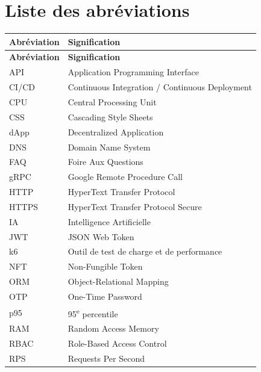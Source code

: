 \chapter*{Liste des abréviations}

\vspace{0.5cm}

\renewcommand{\arraystretch}{1.4}

\begin{longtable}{|p{3cm}|p{11cm}|}
\hline
\textbf{Abréviation} & \textbf{Signification} \\
\hline
\endfirsthead
\hline
\textbf{Abréviation} & \textbf{Signification} \\
\hline
\endhead
\hline
\endfoot
API       & Application Programming Interface \\ \hline
CI/CD     & Continuous Integration / Continuous Deployment \\ \hline
CPU       & Central Processing Unit \\ \hline
CSS       & Cascading Style Sheets \\ \hline
dApp      & Decentralized Application \\ \hline
DNS       & Domain Name System \\ \hline
FAQ       & Foire Aux Questions \\ \hline
gRPC      & Google Remote Procedure Call \\ \hline
HTTP      & HyperText Transfer Protocol \\ \hline
HTTPS     & HyperText Transfer Protocol Secure \\ \hline
IA        & Intelligence Artificielle \\ \hline
JWT       & JSON Web Token \\ \hline
k6        & Outil de test de charge et de performance \\ \hline
NFT       & Non-Fungible Token \\ \hline
ORM       & Object-Relational Mapping \\ \hline
OTP       & One-Time Password \\ \hline
p95       & 95\textsuperscript{e} percentile \\ \hline
RAM       & Random Access Memory \\ \hline
RBAC      & Role-Based Access Control \\ \hline
RPS       & Requests Per Second \\ \hline

\end{longtable}

